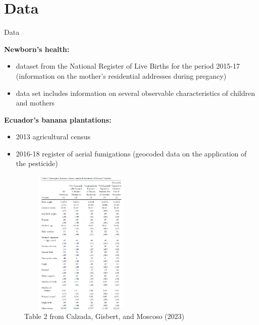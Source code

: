 \documentclass[hyperref={pdfpagelabels=false}]{beamer}
\begin{document}
	
	
	
	\section{Data}
	
	\begin{frame}{Data}
		
		\textbf{Newborn's health:}
		\begin{itemize}
			\justifying
			
			\item dataset from the National Register of Live Births for the period 2015-17  (information on the mother's residential addresses during pregancy)
			\item data set includes information on several observable characteristics of children and mothers
		\end{itemize}
		\textbf{Ecuador's banana plantations:}
		\begin{itemize}
			\item 2013 agricultural census
			\item 2016-18 register of aerial fumigations (geocoded data on the application of the pesticide)
		\end{itemize}
		
	\end{frame}
	
	\begin{frame}{}
		
		\begin{figure}[H]
			\centering
			\includegraphics[width=6cm, height=7cm]{figures-paper/table2.png}
			\caption{Table 2 from Calzada, Gisbert, and Moscoso (2023)}
			\label{fig:enter-label}
		\end{figure}
		
	\end{frame}
	
\end{document}
